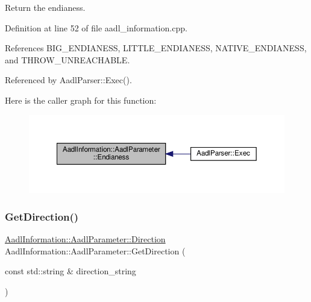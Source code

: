 Return the endianess. 



Definition at line 52 of file aadl\+\_\+information.\+cpp.



References B\+I\+G\+\_\+\+E\+N\+D\+I\+A\+N\+E\+SS, L\+I\+T\+T\+L\+E\+\_\+\+E\+N\+D\+I\+A\+N\+E\+SS, N\+A\+T\+I\+V\+E\+\_\+\+E\+N\+D\+I\+A\+N\+E\+SS, and T\+H\+R\+O\+W\+\_\+\+U\+N\+R\+E\+A\+C\+H\+A\+B\+LE.



Referenced by Aadl\+Parser\+::\+Exec().

Here is the caller graph for this function\+:
\nopagebreak
\begin{figure}[H]
\begin{center}
\leavevmode
\includegraphics[width=350pt]{dc/d60/structAadlInformation_1_1AadlParameter_ab6f9fc5ad1d0f77d9a02967917d18422_icgraph}
\end{center}
\end{figure}
\mbox{\label{structAadlInformation_1_1AadlParameter_aa2e43e8d58fd796e2c9573738db5a41b}} 
\subsubsection{\texorpdfstring{Get\+Direction()}{GetDirection()}}
{\footnotesize\ttfamily \hyperlink{structAadlInformation_1_1AadlParameter_a4f3dba322ae2eb8ecec6f6199f81a77e}{Aadl\+Information\+::\+Aadl\+Parameter\+::\+Direction} Aadl\+Information\+::\+Aadl\+Parameter\+::\+Get\+Direction (\begin{DoxyParamCaption}\item[{const std\+::string \&}]{direction\+\_\+string }\end{DoxyParamCaption})\hspace{0.3cm}{\ttfamily [static]}}



